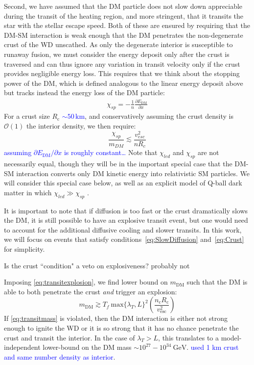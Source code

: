 \documentclass[twocolumn,showpacs,preprintnumbers,amsmath,amssymb,prd]{revtex4}
\newcommand{\OO}{\mathcal{O}}
\newcommand{\GeV}{\text{GeV}}
\def\r{\right)}
\def\l{\left(}
\begin{document}
Second, we have assumed that the DM particle does not slow down appreciable during the transit of the heating region, and more stringent, that it transits the star with the stellar escape speed.  Both of these are ensured by requiring that the DM-SM interaction is weak enough that the DM penetrates the non-degenerate crust of the WD unscathed. As only the degenerate interior is susceptible to runaway fusion, we must consider the energy deposit only after the crust is traversed and can thus ignore any variation in transit velocity only if the crust provides negligible energy loss.  This requires that we think about the stopping power of the DM, which is defined analogous to the linear energy deposit above but tracks instead the energy loss of the DM particle:
\begin{align}
\chi_{sp} = - \frac{1}{n} \frac{\partial{E_{\text{DM}}}}{\partial{x}}
\end{align}
For a crust size $R_{\text{c}}$ \textcolor{blue}{$\sim 50\, \text{km}$}, and conservatively assuming the crust density is $\OO(1)$ the interior density, we then require:
\begin{equation}
\frac{\chi_{sp}}{m_{DM}} \lesssim \frac{v_{esc}^2}{n R_c} \label{eq:Crust}
\end{equation}
\textcolor{blue}{assuming $\partial E_\text{DM}/\partial x$ is roughly constant\ldots}
Note that $\chi_{led}$ and $\chi_{sp}$ are not necessarily equal, though they will be in the important special case that the DM-SM interaction converts only DM kinetic energy into relativistic SM particles. We will consider this special case below, as well as an explicit model of Q-ball dark matter in which $\chi_{led} \gg \chi_{sp}$ .

It is important to note that if diffusion is too fast or the crust dramatically slows the DM, it is still possible to have an explosive transit event, but one would need to account for the additional diffusive cooling and slower transits. In this work, we will focus on events that satisfy conditions~\eqref{eq:SlowDiffusion} and~\eqref{eq:Crust} for simplicity.

{\color{red} Is the crust ``condition" a veto on explosiveness? probably not} 

{\color{blue}
Imposing \eqref{eq:transitexplosion}, we find lower bound on $m_{\text{DM}}$ such that the DM is able to both penetrate the crust \emph{and} trigger an explosion:
\begin{equation}
\label{eq:transitmass}
m_{\text{DM}} \gtrsim  T_f ~\text{max}\{\lambda_T, L\}^2 \l \frac{n_{\text{c}} R_{\text{c}}}{v_{\text{esc}}^2} \r
\end{equation}
If \eqref{eq:transitmass} is violated, then the DM interaction is either not strong enough to ignite the WD or it is so strong that it has no chance penetrate the crust and transit the interior. In the case of $\lambda_T > L$, this translates to a model-independent lower-bound on the DM mass $\sim 10^{27} - 10^{34} ~\GeV$. \textcolor{blue}{used 1 km crust and same number density as interior}.
}
\end{document}
